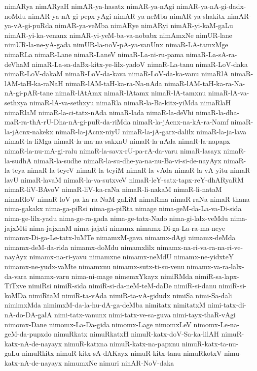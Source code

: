 {nimARya
nimARyaH
nimAR-ya-hasatx
nimAR-ya-nAgi
nimAR-ya-nA-gi-dadx-noMdu
nimAR-ya-nA-gi-pepx-yAgi
nimAR-ya-neMba
nimAR-ya-shakitx
nimAR-ya-vA-gi-puRda
nimAR-ya-veMba
nimARye
nimARyi
nimAR-yi-kaM-gaLu
nimAR-yi-ka-venanx
nimAR-yi-yeM-ba-va-nobabx
nimAmxNe
nimUR-lane
nimUR-la-ne-yA-gada
nimUR-la-noV-pA-ya-vanUnx
nimaR-LA-tamxMge
nimaRLa
nimaR-Lane
nimaR-LaneV
nimaR-La-ni-ru-pama
nimaR-La-sA-ra-deVhaM
nimaR-La-sa-daBx-kitx-ye-lilx-yadoV
nimaR-La-tanu
nimaR-LoV-daka
nimaR-LoV-dakaM
nimaR-LoV-da-kava
nimaR-LoV-da-ka-vanu
nimaRlA
nimaR-lAM-taH-ka-raNaH
nimaR-lAM-taH-ka-ra-Na-nAda
nimaR-lAM-taH-ka-ra-Na-nA-gi-pAR-tane
nimaR-lAtAmx
nimaR-lAtamx
nimaR-lA-tamxnu
nimaR-lA-va-sethxya
nimaR-lA-va-sethxyu
nimaRla
nimaR-la-Ba-kitx-yiMda
nimaRlaH
nimaRlaM
nimaR-la-ci-tatx-nAda
nimaR-lada
nimaR-la-deVhi
nimaR-la-dha-maR-ra-thA-rU-Dha-nA-gi-puR-da-riMda
nimaR-la-jAcnx-na-kA-ra-Namf
nimaR-la-jAcnx-nakekx
nimaR-la-jAcnx-niyU
nimaR-la-jA-garx-dalilx
nimaR-la-ja-lava
nimaR-la-liMga
nimaR-la-ma-na-sakxnU
nimaR-la-nAda
nimaR-la-napapx
nimaR-la-nu-mA-gi-ralu
nimaR-la-savx-rU-pa-rA-da-varu
nimaR-lasayx
nimaR-la-sudhA
nimaR-la-sudhe
nimaR-la-su-dhe-ya-na-nu-Ba-vi-si-de-nayAyx
nimaR-la-teya
nimaR-la-teyeV
nimaR-la-teyiM
nimaR-la-vAda
nimaR-la-vA-yitu
nimaR-lavU
nimaR-lavaM
nimaR-la-va-sutxveV
nimaR-leY-satx-tapx-reY-dhARyaRM
nimaR-liV-BAvoV
nimaR-liV-ka-raNa
nimaR-li-nakaM
nimaR-li-nataM
nimaRloV
nimaR-loV-pa-ka-ra-NaM-gaLiM
nimaRma
nimaR-raNa
nimaR-thana
nima-gakakx
nima-ga-piRsi
nima-ga-piRta
nimage
nima-geM-da-La-va-Di-sida
nima-ge-lilx-yadu
nima-ge-ra-gada
nima-ge-tatx-Nado
nima-gi-lalx-veMdu
nima-jajxMti
nima-jajxnaM
nima-jajxti
nimamx
nimamx-Di-ga-La-ra-ma-neye
nimamx-Di-ga-Le-tatx-luMTe
nimamxM-gava
nimamx-dAgi
nimamx-deMda
nimamx-deM-da-rida
nimamx-doMdu
nimamxlilx
nimamx-na-ri-va-ra-na-ri-ve-nayAyx
nimamx-na-ri-yavu
nimamxne
nimamx-neMdU
nimamx-ne-yidxteY
nimamx-ne-yudx-vaMte
nimamxnu
nimamx-sutx-ti-su-venu
nimamx-va-ra-lalx-da-vara
nimamx-varu
nima-ni-mage
nimemxYkayx
nimiRMda
nimiR-sa-lapx-TiTxve
nimiRsi
nimiR-sida
nimiR-si-da-neM-teM-daDe
nimiR-si-danu
nimiR-si-koMDa
nimiRtaM
nimiR-ta-vAda
nimiR-ta-vA-gidudx
nimiSa
nimi-Sa-dali
nimimxMda
nimimxM-da-la-hu-dA-ga-deMba
nimitatx
nimitatxM
nimi-tatx-di-nA-do-DA-galA
nimi-tatx-vanunx
nimi-tatx-ve-sa-guva
nimi-tayx-thaR-vAgi
nimomx-Dane
nimomx-La-Da-gida
nimomx-Lage
nimomxLeV
nimomx-Le-na-geM-da-pupxdo
nimuRkatx
nimuRkatxH
nimuR-katx-doV-Sa-ka-lilAH
nimuR-katx-nA-de-nayayx
nimuR-katxna
nimuR-katx-na-papxnu
nimuR-katx-ta-nu-gaLu
nimuRkitx
nimuR-kitx-sA-dAKayx
nimuR-kitx-tanu
nimuRkotxV
nimu-katx-nA-de-nayayx
nimumxNe
nimuri
ninAR-NoV-daka
}
